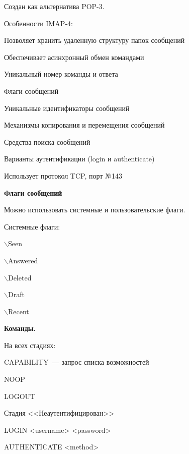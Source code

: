 
Создан как альтернатива POP-3.

Особенности IMAP-4:
\begin{MyItemize}
    \item Позволяет хранить удаленную структуру папок сообщений
    \item Обеспечивает асинхронный обмен командами
    \item Уникальный номер команды и ответа
    \item Флаги сообщений
    \item Уникальные идентификаторы сообщений
    \item Механизмы копирования и перемещения сообщений
    \item Средства поиска сообщений
    \item Варианты аутентификации (login и authenticate)
    \item Использует протокол TCP, порт №143
\end{MyItemize}

{\bf Флаги сообщений}

Можно использовать системные и пользовательские флаги.

Системные флаги:
\begin{MyItemize}
    \item $\backslash$Seen
    \item $\backslash$Answered
    \item $\backslash$Deleted
    \item $\backslash$Draft
    \item $\backslash$Recent
\end{MyItemize}

{\bf Команды.}

На всех стадиях:
\begin{MyItemize}
    \item CAPABILITY~--- запрос списка возможностей
    \item NOOP
    \item LOGOUT
\end{MyItemize}

Стадия <<Неаутентифицирован>>
\begin{MyItemize}
    \item LOGIN <username> <password>
    \item AUTHENTICATE <method>
\end{MyItemize}

